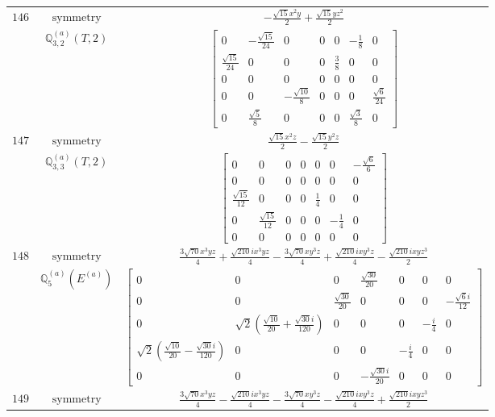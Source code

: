 \documentclass[fleqn,8pt,landscape]{jsarticle}
\begin{document}
\begin{longtable}{ccc}
$ 146 $ & $ \text{symmetry} $ & $ - \frac{\sqrt{15} x^{2} y}{2} + \frac{\sqrt{15} y z^{2}}{2} $ \\
$  $ & $ \mathbb{Q}_{3,2}^{(a)}(T,2) $ & $ \begin{bmatrix} 0 & - \frac{\sqrt{15}}{24} & 0 & 0 & 0 & - \frac{1}{8} & 0 \\ \frac{\sqrt{15}}{24} & 0 & 0 & 0 & \frac{3}{8} & 0 & 0 \\ 0 & 0 & 0 & 0 & 0 & 0 & 0 \\ 0 & 0 & - \frac{\sqrt{10}}{8} & 0 & 0 & 0 & \frac{\sqrt{6}}{24} \\ 0 & \frac{\sqrt{5}}{8} & 0 & 0 & 0 & \frac{\sqrt{3}}{8} & 0 \end{bmatrix} $ \\ \hline
$ 147 $ & $ \text{symmetry} $ & $ \frac{\sqrt{15} x^{2} z}{2} - \frac{\sqrt{15} y^{2} z}{2} $ \\
$  $ & $ \mathbb{Q}_{3,3}^{(a)}(T,2) $ & $ \begin{bmatrix} 0 & 0 & 0 & 0 & 0 & 0 & - \frac{\sqrt{6}}{6} \\ 0 & 0 & 0 & 0 & 0 & 0 & 0 \\ \frac{\sqrt{15}}{12} & 0 & 0 & 0 & \frac{1}{4} & 0 & 0 \\ 0 & \frac{\sqrt{15}}{12} & 0 & 0 & 0 & - \frac{1}{4} & 0 \\ 0 & 0 & 0 & 0 & 0 & 0 & 0 \end{bmatrix} $ \\ \hline
$ 148 $ & $ \text{symmetry} $ & $ \frac{3 \sqrt{70} x^{3} y z}{4} + \frac{\sqrt{210} i x^{3} y z}{4} - \frac{3 \sqrt{70} x y^{3} z}{4} + \frac{\sqrt{210} i x y^{3} z}{4} - \frac{\sqrt{210} i x y z^{3}}{2} $ \\
$  $ & $ \mathbb{Q}_{5}^{(a)}(E^{(a)}) $ & $ \begin{bmatrix} 0 & 0 & 0 & \frac{\sqrt{30}}{20} & 0 & 0 & 0 \\ 0 & 0 & \frac{\sqrt{30}}{20} & 0 & 0 & 0 & - \frac{\sqrt{6} i}{12} \\ 0 & \sqrt{2} \left(\frac{\sqrt{10}}{20} + \frac{\sqrt{30} i}{120}\right) & 0 & 0 & 0 & - \frac{i}{4} & 0 \\ \sqrt{2} \left(\frac{\sqrt{10}}{20} - \frac{\sqrt{30} i}{120}\right) & 0 & 0 & 0 & - \frac{i}{4} & 0 & 0 \\ 0 & 0 & 0 & - \frac{\sqrt{30} i}{20} & 0 & 0 & 0 \end{bmatrix} $ \\ \hline
$ 149 $ & $ \text{symmetry} $ & $ \frac{3 \sqrt{70} x^{3} y z}{4} - \frac{\sqrt{210} i x^{3} y z}{4} - \frac{3 \sqrt{70} x y^{3} z}{4} - \frac{\sqrt{210} i x y^{3} z}{4} + \frac{\sqrt{210} i x y z^{3}}{2} $ \\

\end{longtable}
\end{document}
